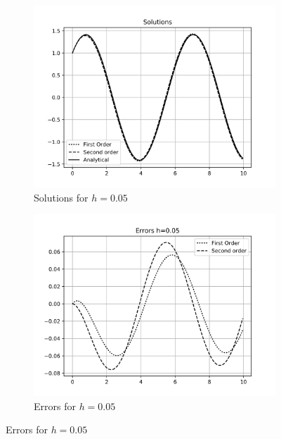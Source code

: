 \documentclass[12,a4paper]{article}
\begin{document}
    \begin{figure}[H]
        \centering
        \begin{subfigure}[t]{0.49\textwidth}
            \includegraphics[width = \textwidth]{plots/taylor_h2.png}
            \caption{Solutions for $h = 0.05$}
            \label{fig:sol_ta1}
        \end{subfigure}
        \begin{subfigure}[t]{0.49\textwidth}
            \includegraphics[width = \textwidth]{plots/taylor_error_h2.png}
            \caption{Errors for $h = 0.05$}
            \label{fig:err_ta2}
        \end{subfigure}
    \end{figure}

    
\end{document}
